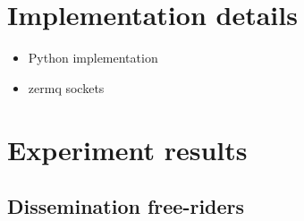 \section{Implementation details}

\begin{itemize}
    \item Python implementation 
    \item zermq sockets
\end{itemize}


\section{Experiment results}
\subsection{Dissemination free-riders}
